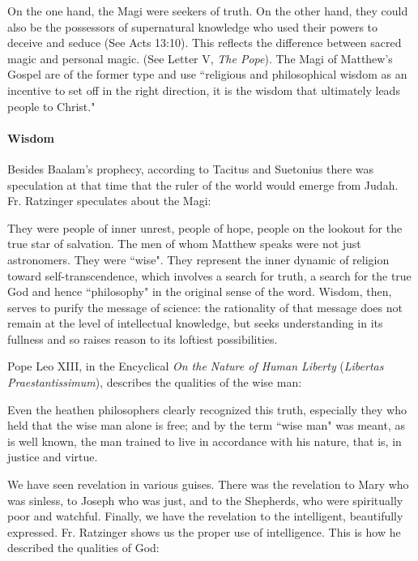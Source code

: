 On the one hand, the Magi were seekers of truth. On the other hand, they could also be the possessors of supernatural knowledge who used their powers to deceive and seduce (See Acts 13:10). This reflects the difference between sacred magic and personal magic. (See Letter V, \textit{The Pope}). The Magi of Matthew's Gospel are of the former type and use ``religious and philosophical wisdom as an incentive to set off in the right direction, it is the wisdom that ultimately leads people to Christ."

\paragraph{Wisdom}
Besides Baalam's prophecy, according to Tacitus and Suetonius there was speculation at that time that the ruler of the world would emerge from Judah. Fr. Ratzinger speculates about the Magi:

\begin{quotex}
They were people of inner unrest, people of hope, people on the lookout for the true star of salvation. The men of whom Matthew speaks were not just astronomers. They were ``wise". They represent the inner dynamic of religion toward self-transcendence, which involves a search for truth, a search for the true God and hence ``philosophy" in the original sense of the word. Wisdom, then, serves to purify the message of science: the rationality of that message does not remain at the level of intellectual knowledge, but seeks understanding in its fullness and so raises reason to its loftiest possibilities. 

\end{quotex}
Pope Leo XIII, in the Encyclical \emph{On the Nature of Human Liberty} (\emph{Libertas Praestantissimum}), describes the qualities of the wise man:

\begin{quotex}
Even the heathen philosophers clearly recognized this truth, especially they who held that the wise man alone is free; and by the term ``wise man" was meant, as is well known, the man trained to live in accordance with his nature, that is, in justice and virtue. 

\end{quotex}
We have seen revelation in various guises. There was the revelation to Mary who was sinless, to Joseph who was just, and to the Shepherds, who were spiritually poor and watchful. Finally, we have the revelation to the intelligent, beautifully expressed. Fr. Ratzinger shows us the proper use of intelligence. This is how he described the qualities of God:

